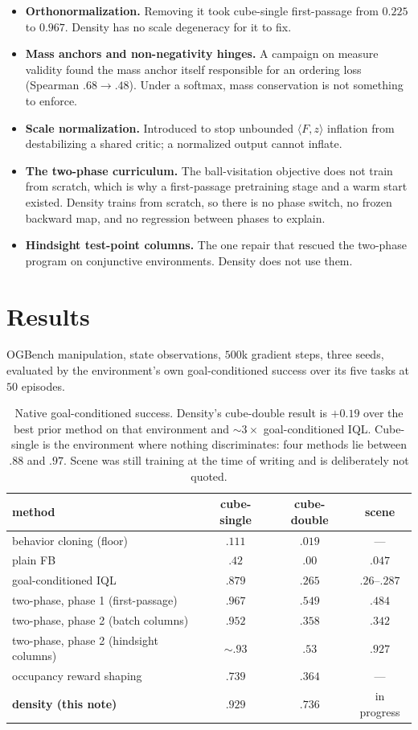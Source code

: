 \documentclass{article}
\begin{document}
\begin{itemize}
\item \textbf{Orthonormalization.} Removing it took cube-single first-passage from $0.225$
to $0.967$. Density has no scale degeneracy for it to fix.
\item \textbf{Mass anchors and non-negativity hinges.} A campaign on measure validity found
the mass anchor itself responsible for an ordering loss (Spearman $.68\to.48$). Under a
softmax, mass conservation is not something to enforce.
\item \textbf{Scale normalization.} Introduced to stop unbounded $\langle F,z\rangle$
inflation from destabilizing a shared critic; a normalized output cannot inflate.
\item \textbf{The two-phase curriculum.} The ball-visitation objective does not train from
scratch, which is why a first-passage pretraining stage and a warm start existed. Density
trains from scratch, so there is no phase switch, no frozen backward map, and no
regression between phases to explain.
\item \textbf{Hindsight test-point columns.} The one repair that rescued the two-phase
program on conjunctive environments. Density does not use them.
\end{itemize}

\section{Results}

OGBench manipulation, state observations, $500$k gradient steps, three seeds, evaluated by
the environment's own goal-conditioned success over its five tasks at $50$ episodes.

\begin{table}[h]
\centering
\small
\setlength{\tabcolsep}{5pt}
\begin{tabular}{lccc}
\toprule
method & cube-single & cube-double & scene \\
\midrule
behavior cloning (floor) & $.111$ & $.019$ & --- \\
plain FB & $.42$ & $.00$ & $.047$ \\
goal-conditioned IQL & $.879$ & $.265$ & $.26$--$.287$ \\
two-phase, phase 1 (first-passage) & $\mathbf{.967}$ & $.549$ & $.484$ \\
two-phase, phase 2 (batch columns) & $.952$ & $.358$ & $.342$ \\
two-phase, phase 2 (hindsight columns) & ${\sim}.93$ & $.53$ & $\mathbf{.927}$ \\
occupancy reward shaping & $.739$ & $.364$ & --- \\
\textbf{density (this note)} & $.929$ & $\mathbf{.736}$ & in progress \\
\bottomrule
\end{tabular}
\caption{Native goal-conditioned success. Density's cube-double result is $+0.19$ over the
best prior method on that environment and ${\sim}3\times$ goal-conditioned IQL. Cube-single
is the environment where nothing discriminates: four methods lie between $.88$ and $.97$.
Scene was still training at the time of writing and is deliberately not quoted.}
\end{table}
\end{document}
